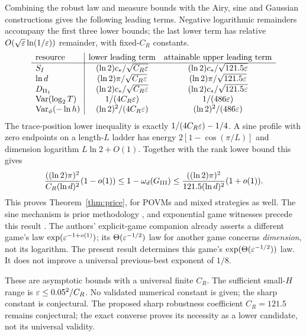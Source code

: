 Combining the robust law and measure bounds with the Airy, sine and Gaussian constructions gives the following leading terms. Negative logarithmic remainders accompany the first three lower bounds; the last lower term has relative $O(\sqrt{\varepsilon}\ln(1/\varepsilon))$ remainder, with fixed-$C_R$ constants.
\[
\begin{array}{l|cc}
\text{resource}&\text{lower leading term}&\text{attainable upper leading term}\\\hline
 S_I&(\ln2)c_*/\sqrt{C_R\varepsilon}&(\ln2)c_*/\sqrt{121.5\varepsilon}\\
 \ln d&(\ln2)\pi/\sqrt{C_R\varepsilon}&(\ln2)\pi/\sqrt{121.5\varepsilon}\\
 D_{\mathrm{II}_1}&(\ln2)c_*/\sqrt{C_R\varepsilon}&(\ln2)c_*/\sqrt{121.5\varepsilon}\\
 \operatorname{Var}(\log_2T)&1/(4C_R\varepsilon)&1/(486\varepsilon)\\
 \operatorname{Var}_\phi(-\ln h)&(\ln2)^2/(4C_R\varepsilon)&(\ln2)^2/(486\varepsilon)
\end{array}
\]
The trace-position lower inequality is exactly $1/(4C_R\varepsilon)-1/4$. A sine profile with zero endpoints on a length-$L$ ladder has energy $2[1-\cos(\pi/L)]$ and dimension logarithm $L\ln2+O(1)$. Together with the rank lower bound this gives
\[
 \frac{((\ln2)\pi)^2}{C_R(\ln d)^2}(1-o(1))
 \le1-\omega_d(G_{\mathrm{III}})
 \le\frac{((\ln2)\pi)^2}{121.5(\ln d)^2}(1+o(1)).
\]
This proves Theorem~\ref{thm:price}, for POVMs and mixed strategies as well. The sine mechanism is prior methodology \cite{LTW,Precision}, and exponential game witnesses precede this result \cite{Coladangelo,Explicit}. The authors' explicit-game companion already asserts a different game's law $\exp(\varepsilon^{-1+o(1)})$; its $\Theta(\varepsilon^{-1/2})$ law for another game concerns \emph{dimension}, not its logarithm. The present result determines this game's $\exp(\Theta(\varepsilon^{-1/2}))$ law. It does not improve a universal previous-best exponent of $1/8$.

These are asymptotic bounds with a universal finite $C_R$. The sufficient small-$H$ range is $\varepsilon\le0.05^2/C_R$. No validated numerical constant is given; the sharp constant is conjectural. The proposed sharp robustness coefficient $C_R=121.5$ remains conjectural; the exact converse proves its necessity as a lower candidate, not its universal validity.

